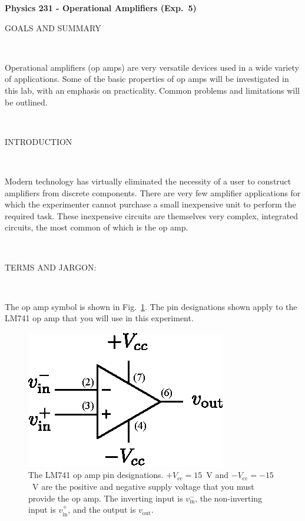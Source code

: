 \documentclass[12pt,oneside,openany,letterpaper]{article}
\begin{document}
\thispagestyle{plain}
\begin{center}
{\large{\bf{\selectfont Physics 231 - Operational Amplifiers (Exp.~5)}}}
\end{center}

\noindent GOALS AND SUMMARY

~

\noindent Operational amplifiers (op amps) are very versatile devices used in a wide variety of applications. Some of the basic properties of op amps will be investigated in this lab, with an emphasis on practicality. Common problems and limitations will be outlined. 

~

\noindent INTRODUCTION

~

\noindent Modern technology has virtually eliminated the necessity of a user to construct amplifiers from discrete components. There are very few amplifier applications for which the experimenter cannot purchase a small inexpensive unit to perform the required task. These inexpensive circuits are themselves very complex, integrated circuits, the most common of which is the op amp.

~

\noindent TERMS AND JARGON:

~
 
\noindent The op amp symbol is shown in Fig.~\ref{fig:1}.  The pin designations shown apply to the LM741 op amp that you will use in this experiment.
\begin{figure}[h!]
\begin{center}
\includegraphics[width=5.5 cm]{opamp.eps}
\caption{\label{fig:1}The LM741 op amp pin designations. $+V_\mathrm{cc}=15$~V and $-V_\mathrm{cc}=-15$~V are the positive and negative supply voltage that you must provide the op amp.  The inverting input is $v_\mathrm{in}^-$, the non-inverting input is $v_\mathrm{in}^+$, and the output is $v_\mathrm{out}$.}
\end{center}
\end{figure}

~
\end{document}
